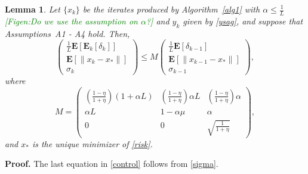\documentclass[11pt]{article}
\newtheorem{lem}[thm]{Lemma}
\newcommand{\E}{\mathbf{E}}
\begin{document}
\begin{lem} \label{lemma:main} Let $\{x_k\}$ be the iterates produced by Algorithm~\ref{alg1} with $\alpha \leq \frac{1}{L}$ \textcolor{green}{[Figen:Do we use the assumption on $\alpha$?]} and $y_k$ given by \eqref{ysag}, and suppose that Assumptions~A1 - A4 hold.  Then,  
\begin{equation}\label{control}
 \begin{pmatrix} \frac{1}{L}\E[\E_k[\delta_k]]\\ \E[\|x_k-x_\ast \|] \\ \sigma_k \end{pmatrix} 
\leq M
 \begin{pmatrix} \frac{1}{L}\E[\delta_{k-1}] \\ \E[\| x_{k-1}-x_\ast \|] \\ \sigma_{k-1} \end{pmatrix} ,
\end{equation}
where
\begin{equation}\label{eq:M}
 M = \begin{pmatrix} {\left(\frac{1-\eta}{1+\eta}\right)}(1+\alpha  L)  &    {\left(\frac{1-\eta}{1+\eta}\right)}\alpha L & {\left(\frac{1-\eta}{1+\eta}\right)} \alpha \\  
                   \alpha L  & 1-\alpha \mu &  \alpha  \\
                   0 & 0 & \sqrt{ \frac{1}{1+\eta}}  \end{pmatrix},                   
\end{equation}
and $x_\ast$ is the unique minimizer of \eqref{risk}.
\end{lem}

\noindent 
\textbf{Proof.} The last equation in \eqref{control} follows from \eqref{sigma}. 
\end{document}
